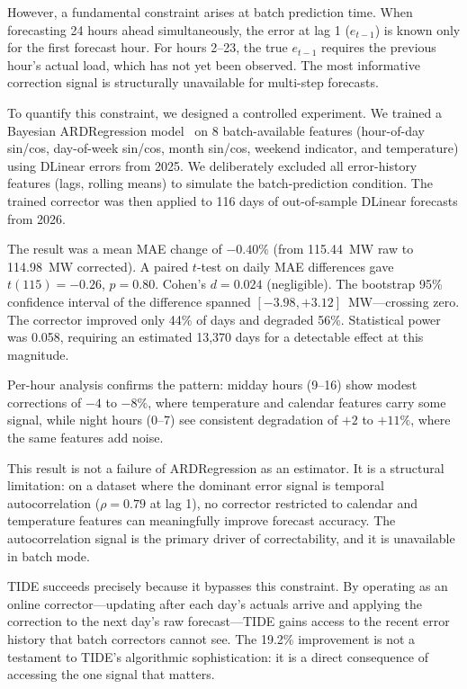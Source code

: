 \documentclass[11pt,letterpaper]{article}
\begin{document}
However, a fundamental constraint arises at batch prediction time. When forecasting 24 hours ahead simultaneously, the error at lag 1 ($e_{t-1}$) is known only for the first forecast hour. For hours 2--23, the true $e_{t-1}$ requires the previous hour's actual load, which has not yet been observed. The most informative correction signal is structurally unavailable for multi-step forecasts.

To quantify this constraint, we designed a controlled experiment. We trained a Bayesian ARDRegression model~\cite{scikit-learn} on 8 batch-available features (hour-of-day sin/cos, day-of-week sin/cos, month sin/cos, weekend indicator, and temperature) using DLinear errors from 2025. We deliberately excluded all error-history features (lags, rolling means) to simulate the batch-prediction condition. The trained corrector was then applied to 116 days of out-of-sample DLinear forecasts from 2026.

The result was a mean MAE change of $-0.40\%$ (from 115.44~MW raw to 114.98~MW corrected). A paired $t$-test on daily MAE differences gave $t(115) = -0.26$, $p = 0.80$. Cohen's $d = 0.024$ (negligible). The bootstrap 95\% confidence interval of the difference spanned $[-3.98, +3.12]$~MW---crossing zero. The corrector improved only 44\% of days and degraded 56\%. Statistical power was 0.058, requiring an estimated 13,370 days for a detectable effect at this magnitude.

Per-hour analysis confirms the pattern: midday hours (9--16) show modest corrections of $-4$ to $-8\%$, where temperature and calendar features carry some signal, while night hours (0--7) see consistent degradation of $+2$ to $+11\%$, where the same features add noise.

This result is not a failure of ARDRegression as an estimator. It is a structural limitation: on a dataset where the dominant error signal is temporal autocorrelation ($\rho = 0.79$ at lag 1), no corrector restricted to calendar and temperature features can meaningfully improve forecast accuracy. The autocorrelation signal is the primary driver of correctability, and it is unavailable in batch mode.

TIDE succeeds precisely because it bypasses this constraint. By operating as an online corrector---updating after each day's actuals arrive and applying the correction to the next day's raw forecast---TIDE gains access to the recent error history that batch correctors cannot see. The 19.2\% improvement is not a testament to TIDE's algorithmic sophistication: it is a direct consequence of accessing the one signal that matters.
\end{document}
